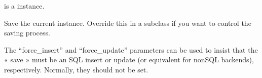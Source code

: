 \documentclass[letterpaper,10pt,french]{sphinxmanual}
\begin{document}
\begin{fulllineitems}
\begin{fulllineitems}
\begin{sphinxVerbatim}[commandchars=\\\{\}]
 
       
\end{sphinxVerbatim}

\sphinxAtStartPar
{} is a  instance.

\end{fulllineitems}


\begin{fulllineitems}
\label{\detokenize{main/model:main.models.Enseignant.personnel_ptr_id}}
\pysigstartsignatures
{}
\pysigstopsignatures
\end{fulllineitems}


\begin{fulllineitems}
\label{\detokenize{main/model:main.models.Enseignant.save}}
\pysigstartsignatures
{}
\pysigstopsignatures
\sphinxAtStartPar
Save the current instance. Override this in a subclass if you want to
control the saving process.

\sphinxAtStartPar
The “force\_insert” and “force\_update” parameters can be used to insist
that the « save » must be an SQL insert or update (or equivalent for
non\sphinxhyphen{}SQL backends), respectively. Normally, they should not be set.

\end{fulllineitems}



\end{fulllineitems}
\end{document}
